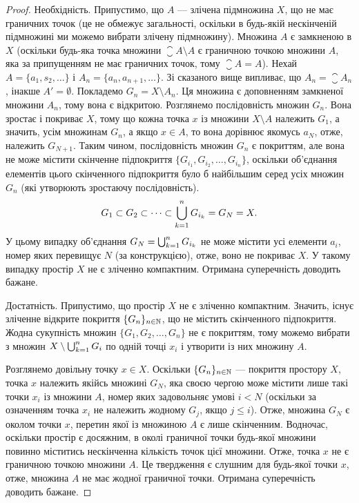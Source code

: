 \begin{proof}
Необхідність. Припустимо, що $A$ ---
злічена підмножина $X$, що не має граничних точок (це не
обмежує загальності, оскільки в будь-якій нескінченій
підмножині ми можемо вибрати злічену підмножину).
Множина $A$ є замкненою в $X$ (оскільки будь-яка точка
множини $\closure A \setminus A$ є граничною точкою множини $A$, яка за
припущенням не має граничних точок, тому $\closure A = A$). Нехай
$A = \{a_1, s_2, \dots\}$ і $A_n = \{a_n, a_{n + 1}, \dots\}$.
Зі сказаного вище випливає,
що $A_n = \closure A_n$, інакше $A' = \emptyset$.
Покладемо $G_n = X \setminus A_n$. Ця
множина є доповненням замкненої множини $A_n$, тому вона
є відкритою. Розглянемо послідовність множин $G_n$. Вона
зростає і покриває $X$, тому що кожна точка $x$ із множини
$X \setminus A$ належить $G_1$, а значить, усім множинам $G_n$, а якщо
$x \in A$, то вона дорівнює якомусь $a_N$, отже, належить $G_{N + 1}$.
Таким чином, послідовність множин $G_n$ є покриттям, але
вона не може містити скінченне підпокриття
$\{G_{i_1}, G_{i_2}, \dots, G_{i_n}\}$,
оскільки об’єднання елементів цього
скінченного підпокриття було б найбільшим серед усіх
множин $G_n$ (які утворюють зростаючу послідовність).
\begin{equation*}
G_1 \subset G_2 \subset \dots \subset \operatorname*{\bigcup}_{k = 1}^n G_{i_k} = G_N = X.
\end{equation*}
У цьому випадку об’єднання $G_N = \operatorname*{\bigcup}_{k = 1}^n G_{i_k}$
не може містити
усі елементи $a_i$, номер яких перевищує $N$ (за
конструкцією), отже, воно не покриває $X$. У такому
випадку простір $X$ не є зліченно компактним. Отримана
суперечність доводить бажане.

Достатність. Припустимо, що простір $X$ не є зліченно
компактним. Значить, існує зліченне відкрите покриття
$\{G_n\}_{n \in \mathbb{N}}$, що не містить скінченного підпокриття.
Жодна сукупність множин $\{G_1, G_2, \dots, G_n\}$ не є покриттям,
тому можемо вибрати з множин $X \setminus \operatorname*{\bigcup}_{k = 1}^n G_i$
по одній точці $x_i$ і утворити із них множину $A$.

Розглянемо довільну точку $x \in X$. Оскільки $\{G_n\}_{n \in \mathbb{N}}$ ---
покриття простору $X$, точка $x$ належить якійсь множині
$G_N$, яка своєю чергою може містити лише такі точки $x_i$ із
множини $A$, номер яких задовольняє умові $i < N$ (оскільки
за означенням точка $x_i$ не належить жодному $G_j$, якщо
$j \le i$). Отже, множина $G_N$ є околом точки $x$, перетин якої
із множиною $A$ є лише скінченним. Водночас, оскільки
простір є досяжним, в околі граничної точки будь-якої
множини повинно міститись нескінченна кількість точок
цієї множини. Отже, точка $x$ не є граничною точкою
множини $A$. Це твердження є слушним для будь-якої точки
$x$, отже, множина $A$ не має жодної граничної точки.
Отримана суперечність доводить бажане.
\end{proof}


